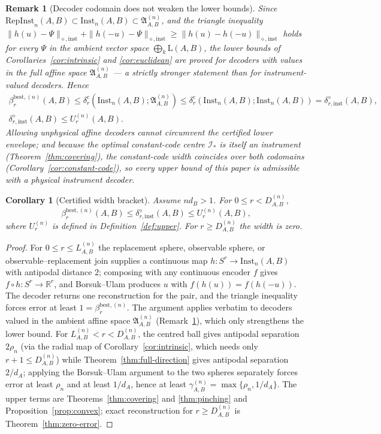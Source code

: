\documentclass[11pt,a4paper]{article}
\newtheorem{corollary}[theorem]{Corollary}
\newtheorem{remark}[theorem]{Remark}
\newcommand{\Lin}{\mathrm{L}}
\newcommand{\Inst}{\mathrm{Inst}}
\newcommand{\RepInst}{\mathrm{RepInst}}
\begin{document}
\begin{remark}[Decoder codomain does not weaken the lower bounds]
\label{rem:decoder-codomain}
Since $\RepInst_n(A,B)\subset\Inst_n(A,B)\subset\mathfrak A_{A,B}^{(n)}$, and the triangle inequality $\|h(u)-\Psi\|_{\diamond,\mathrm{inst}}+\|h(-u)-\Psi\|_{\diamond,\mathrm{inst}}\ge\|h(u)-h(-u)\|_{\diamond,\mathrm{inst}}$ holds for every $\Psi$ in the ambient vector space $\bigoplus_k\Lin(A,B)$, the lower bounds of Corollaries~\ref{cor:intrinsic} and \ref{cor:euclidean} are proved for decoders with values in the full affine space $\mathfrak A_{A,B}^{(n)}$ --- a strictly stronger statement than for instrument-valued decoders. Hence
\begin{gather*}
\beta_r^{\mathrm{best},(n)}(A,B)
\le\delta_r^{\mathrm c}(\Inst_n(A,B);\mathfrak A_{A,B}^{(n)})
\le\delta_r^{\mathrm c}(\Inst_n(A,B);\Inst_n(A,B))
=\delta_{r,\mathrm{inst}}^{\diamond}(A,B),\\
\delta_{r,\mathrm{inst}}^{\diamond}(A,B)\le U_r^{(n)}(A,B).
\end{gather*}
Allowing unphysical affine decoders cannot circumvent the certified lower envelope; and because the optimal constant-code centre $\mathcal I_*$ is itself an instrument (Theorem~\ref{thm:covering}), the constant-code width coincides over both codomains (Corollary~\ref{cor:constant-code}), so every upper bound of this paper is admissible with a physical instrument decoder.
\end{remark}

\begin{corollary}[Certified width bracket]
\label{cor:bracket}
Assume $nd_B>1$. For $0\le r<D_{A,B}^{(n)}$,
\[
\beta_r^{\mathrm{best},(n)}(A,B)
\le\delta_{r,\mathrm{inst}}^{\diamond}(A,B)
\le U_r^{(n)}(A,B),
\]
where $U_r^{(n)}$ is defined in Definition~\ref{def:upper}. For $r\ge D_{A,B}^{(n)}$ the width is zero.
\end{corollary}

\begin{proof}
For $0\le r\le L_{A,B}^{(n)}$ the replacement sphere, observable sphere, or observable--replacement join supplies a continuous map $h:S^r\to\Inst_n(A,B)$ with antipodal distance $2$; composing with any continuous encoder $f$ gives $f\circ h:S^r\to\mathbb R^r$, and Borsuk--Ulam produces $u$ with $f(h(u))=f(h(-u))$. The decoder returns one reconstruction for the pair, and the triangle inequality forces error at least $1=\beta_r^{\mathrm{best},(n)}$. The argument applies verbatim to decoders valued in the ambient affine space $\mathfrak A_{A,B}^{(n)}$ (Remark~\ref{rem:decoder-codomain}), which only strengthens the lower bound. For $L_{A,B}^{(n)}<r<D_{A,B}^{(n)}$, the centred ball gives antipodal separation $2\rho_n$ (via the radial map of Corollary~\ref{cor:intrinsic}, which needs only $r+1\le D_{A,B}^{(n)}$) while Theorem~\ref{thm:full-direction} gives antipodal separation $2/d_A$; applying the Borsuk--Ulam argument to the two spheres separately forces error at least $\rho_n$ and at least $1/d_A$, hence at least $\gamma_{A,B}^{(n)}=\max\{\rho_n,1/d_A\}$. The upper terms are Theorems~\ref{thm:covering} and \ref{thm:pinching} and Proposition~\ref{prop:convex}; exact reconstruction for $r\ge D_{A,B}^{(n)}$ is Theorem~\ref{thm:zero-error}.
\end{proof}
\end{document}

